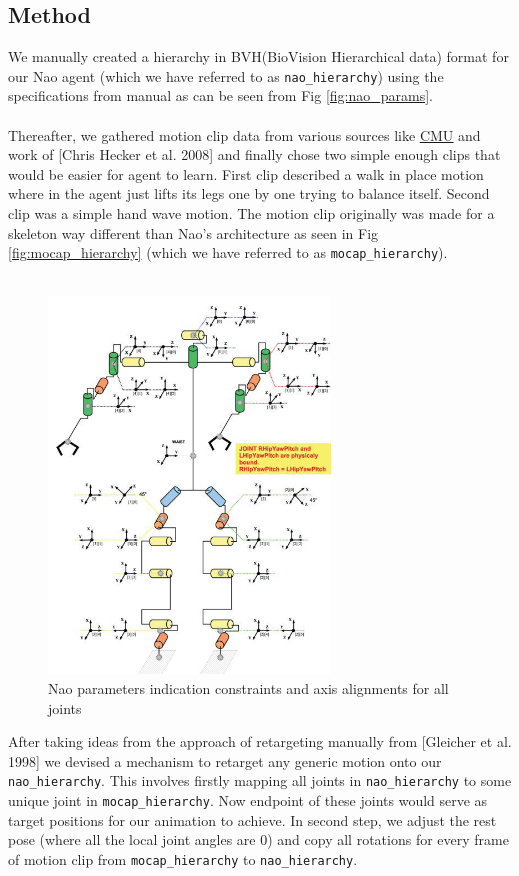 \subsection{Method}
We manually created a hierarchy in BVH(BioVision Hierarchical data) \cite{Maddock_motioncapture} format  for our Nao \cite{usermanual} agent (which we have referred to as \texttt{nao\_hierarchy}) using the specifications from manual as can be seen from Fig \ref{fig:nao_params}. 
\\\\
Thereafter, we gathered motion clip data from various sources like \href{http://mocap.cs.cmu.edu}{\underline{CMU}} and work of [Chris Hecker et al. 2008]\cite{sporeanim} and finally chose two simple enough clips that would be easier for agent to learn. First clip described a walk in place motion where in the agent just lifts its legs one by one trying to balance itself. Second clip was a simple hand wave motion. The motion clip originally was made for a skeleton way different than Nao's architecture as seen in Fig \ref{fig:mocap_hierarchy} (which we have referred to as \texttt{mocap\_hierarchy}).
\\\\
\begin{figure}
\centering
  \includegraphics[width=0.7\linewidth, height=10cm,keepaspectratio]{images/nao_joints.png}
  \caption{Nao parameters indication constraints and axis alignments for all joints}
  \label{fig:nao_joints}
\end{figure}
After taking ideas from the approach of retargeting manually from [Gleicher et al. 1998]\cite{Gleicher:1998:RMN:280814.280820} we devised a mechanism to retarget any generic motion onto our \texttt{nao\_hierarchy}. This involves firstly mapping all joints in \texttt{nao\_hierarchy} to some unique joint in \texttt{mocap\_hierarchy}. Now endpoint of these joints would serve as target positions for our animation to achieve. In second step, we adjust the rest pose (where all the local joint angles are 0) and copy all rotations for every frame of motion clip from \texttt{mocap\_hierarchy} to \texttt{nao\_hierarchy}. 

